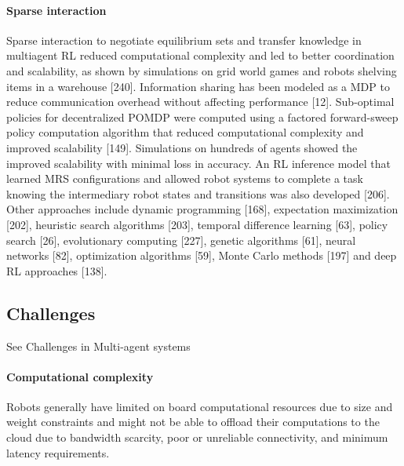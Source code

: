 \documentclass{article}
\begin{document}
   		\paragraph{Sparse interaction} Sparse interaction to negotiate equilibrium sets and transfer knowledge in multiagent RL reduced computational complexity and led to better coordination and scalability, as shown by simulations on grid world games and robots shelving items in a warehouse \citet{rizk-2019-cooperative-heterogeneous-multi-robot-systems-a-survey}[240]. Information sharing has been modeled as a MDP to reduce communication overhead without affecting performance \citet{rizk-2019-cooperative-heterogeneous-multi-robot-systems-a-survey}[12]. 
   		Sub-optimal policies for decentralized POMDP were computed using a factored forward-sweep policy computation algorithm that reduced computational complexity and improved scalability
   		\citet{rizk-2019-cooperative-heterogeneous-multi-robot-systems-a-survey}[149]. Simulations on hundreds of agents showed the improved scalability with minimal loss in accuracy. An RL inference model that learned MRS configurations and allowed robot systems to complete a task knowing the intermediary robot states and transitions was also developed \citet{rizk-2019-cooperative-heterogeneous-multi-robot-systems-a-survey}[206]. Other approaches include dynamic programming \citet{rizk-2019-cooperative-heterogeneous-multi-robot-systems-a-survey}[168], expectation maximization \citet{rizk-2019-cooperative-heterogeneous-multi-robot-systems-a-survey}[202], heuristic search algorithms \citet{rizk-2019-cooperative-heterogeneous-multi-robot-systems-a-survey}[203], temporal difference learning \citet{rizk-2019-cooperative-heterogeneous-multi-robot-systems-a-survey}[63], policy search [26], evolutionary computing \citet{rizk-2019-cooperative-heterogeneous-multi-robot-systems-a-survey}[227], genetic algorithms \citet{rizk-2019-cooperative-heterogeneous-multi-robot-systems-a-survey}[61], neural networks \citet{rizk-2019-cooperative-heterogeneous-multi-robot-systems-a-survey}[82], optimization algorithms [59], Monte
   		Carlo methods \citet{rizk-2019-cooperative-heterogeneous-multi-robot-systems-a-survey}[197] and deep RL approaches \citet{rizk-2019-cooperative-heterogeneous-multi-robot-systems-a-survey}[138].
   		\subsection{Challenges}
   			See Challenges in Multi-agent systems
   			\paragraph{Computational complexity} Robots generally have limited on board computational resources due to size and weight constraints and might not be able to offload their computations to the cloud due to bandwidth scarcity, poor or unreliable connectivity, and minimum latency requirements. 
\end{document}
